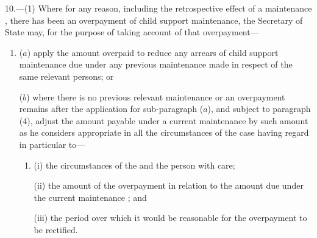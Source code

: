 \documentclass[12pt,a4paper]{article}
\begin{document}
10.—(1) Where for any reason, including the retrospective effect of a%
maintenance 
, there has been an overpayment of child support maintenance, 
the Secretary of State  %
may, for the purpose of taking account of that overpayment—
\begin{enumerate}\item[]
($a$) apply the amount overpaid to reduce any arrears of child support maintenance due under any previous maintenance 
made in respect of the same relevant persons; or

($b$) where there is no previous relevant maintenance 
or an overpayment remains after the application for sub-paragraph ($a$), and subject to paragraph (4), adjust the amount payable under a current maintenance 
by such amount as he considers appropriate in all the circumstances of the case having regard in particular to—
\begin{enumerate}\item[]
(i) the circumstances of the 
and the person with care;

\begin{sloppypar}
(ii) the amount of the overpayment in relation to the amount due under the current maintenance 
; and
\end{sloppypar}

(iii) the period over which it would be reasonable for the overpayment to be rectified.
\end{enumerate}
\end{enumerate}
\end{document}
